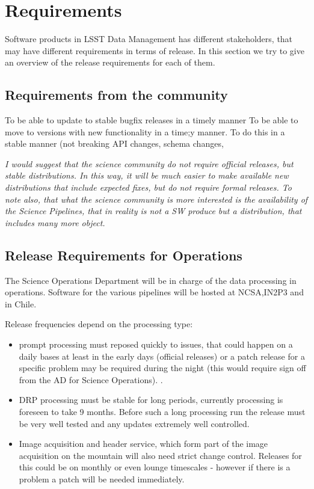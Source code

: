 \section{Requirements} \label{sec:reqs}

Software products in \gls{LSST} Data Management has different stakeholders, that may have different requirements in terms of release.
In this section we try to give an overview of the release requirements for each of them.


\subsection{Requirements from the community } \label{sec:comreqs}

To be able to update to stable bugfix releases in a timely manner
To be able to move to versions with new functionality in a time;y manner.
To do this in a stable manner (not breaking \gls{API} changes, schema changes,

\textit{ I would suggest that the science community do not require official releases, but stable distributions.
In this way, it will be much easier to make available new distributions that include expected fixes,
but do not require formal releases.
To note also, that what the science community is more interested is the availability of the Science Pipelines,
that in reality is not a \gls{SW} produce but a distribution, that includes many more object.  }

\subsection{Release Requirements for Operations} \label{sec:procreqs}

The Science Operations Department will be  in charge  of the data processing in operations. Software for the various pipelines
will be hosted at \gls{NCSA},IN2P3 and in Chile.

Release frequencies depend on the processing type:

\begin{itemize}
\item prompt processing must reposed quickly to issues, that could happen on a daily bases at least in the early days (official releases)
 or a  patch release  for a specific problem may be required during the night (this would require sign off from the AD for Science Operations).  .
\item \gls{DRP} processing  must be stable for long periods, currently processing is foreseen to take 9 months.  Before such a long processing run the release must be very well tested and any updates extremely well controlled.
\item Image acquisition and header service, which form part of the image acquisition on the mountain will also need strict change control. Releases for this could be on monthly or even lounge timescales - however if there is a problem a patch will be needed immediately.
\end{itemize}

